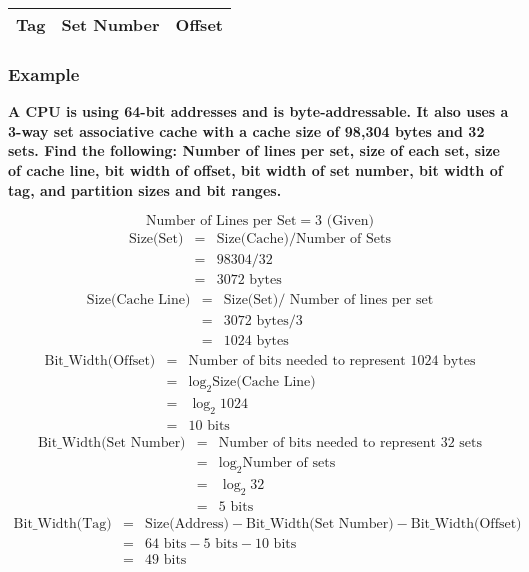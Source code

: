 \documentclass[11pt]{article}
\begin{document}
\begin{table}[H]
	\centering
	\begin{tabular}{| c | c | c|}
		\hline
		Tag			&		Set Number	&	 Offset\\
		\hline
	\end{tabular}
\end{table}

\subsubsection{Example}

\textbf{A CPU is using 64-bit addresses and is byte-addressable. It also uses a 3-way set associative cache with a cache size of 98,304 bytes and 32 sets. Find the following: Number of lines per set, size of each set, size of cache line, bit width of offset, bit width of set number, bit width of tag, and partition sizes and bit ranges.}

\[
	\text{Number of Lines per Set} = 3 \text{ (Given)}
\]
\begin{eqnarray*}
	\text{Size(Set)} &=& \text{Size(Cache)} / \text{Number of Sets}\\
		&=& 98304 / 32\\
		&=& 3072 \text{ bytes}
\end{eqnarray*}
\begin{eqnarray*}
	\text{Size(Cache Line)} &=& \text{Size(Set)} / \text{ Number of lines per set}\\
	&=& 3072 \text{ bytes} / 3\\
	&=& 1024 \text{ bytes}
\end{eqnarray*}
\begin{eqnarray*}
	\text{Bit\_Width(Offset)} &=& \text{Number of bits needed to represent 1024 bytes}\\
	&=& \log_2 \text{Size(Cache Line)}\\
	&=& \log_2 1024\\
	&=& 10 \text{ bits}
\end{eqnarray*}
\begin{eqnarray*}
	\text{Bit\_Width(Set Number)} &=& \text{Number of bits needed to represent 32 sets}\\
	&=& \log_2 \text{Number of sets}\\
	&=& \log_2 32\\
	&=& 5 \text{ bits}
\end{eqnarray*}
\begin{eqnarray*}
	\text{Bit\_Width(Tag)} &=& \text{Size(Address)} - \text{Bit\_Width(Set Number)} - \text{Bit\_Width(Offset)}\\
	&=& 64 \text{ bits} - 5 \text{ bits} - 10 \text{ bits}\\
	&=& 49 \text{ bits}
\end{eqnarray*}
\end{document}
